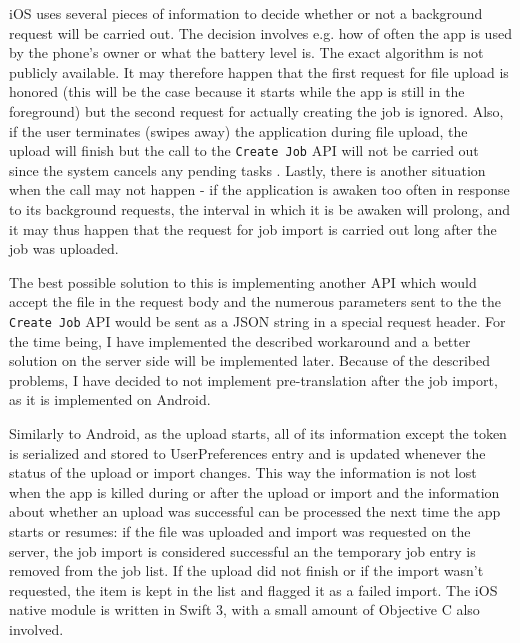 iOS uses several pieces of information to decide whether or not a background request will be carried out. The decision involves e.g. how of often the app is used by the phone's owner or what the battery level is. The exact algorithm is not publicly available. It may therefore happen that the first request for file upload is honored (this will be the case because it starts while the app is still in the foreground) but the second request for actually creating the job is ignored. Also, if the user terminates (swipes away) the application during file upload, the upload will finish but the call to the \texttt{Create Job} API will not be carried out since the system cancels any pending tasks \cite{ios:terminationOfPendingTasks}. Lastly, there is another situation when the call may not happen - if the application is awaken too often in response to its background requests, the interval in which it is be awaken will prolong, and it may thus happen that the request for job import is carried out long after the job was uploaded.

The best possible solution to this is implementing another API which would accept the file in the request body and the numerous parameters sent to the the \texttt{Create Job} API would be sent as a JSON string in a special request header. For the time being, I have implemented the described workaround and a better solution on the server side will be implemented later. Because of the described problems, I have decided to not implement pre-translation after the job import, as it is implemented on Android.


Similarly to Android, as the upload starts, all of its information except the token is serialized and stored to UserPreferences entry and is updated whenever the status of the upload or import changes. This way the information is not lost when the app is killed during or after the upload or import and the information about whether an upload was successful can be processed the next time the app starts or resumes: if the file was uploaded and import was requested on the server, the job import is considered successful an the  temporary job entry is removed from the job list. If the upload did not finish or if the import wasn't requested, the item is kept in the list and flagged it as a failed import. The iOS native module is written in Swift 3, with a small amount of Objective C also involved.


